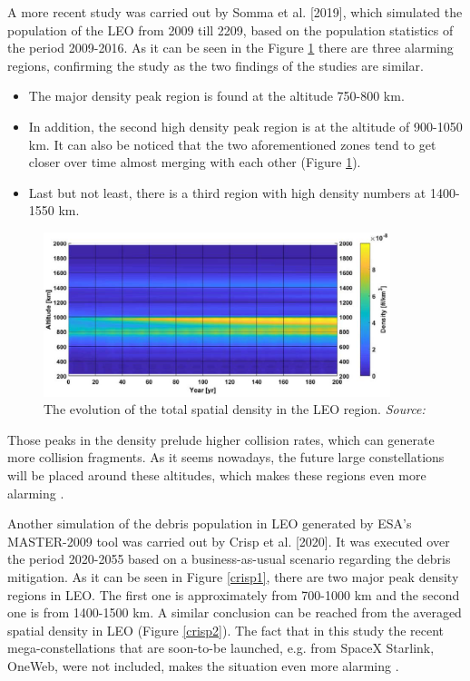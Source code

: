 A more recent study was carried out by Somma et al. [2019], which simulated the population of the LEO from 2009 till 2209, based on the population statistics of the period 2009-2016. As it can be seen in the Figure \ref{Somma} there are three alarming regions, confirming the \cite{Kramer 2002} study as the two findings of the studies are similar.
\begin{itemize}
\item The major density peak region is found at the altitude 750-800 km.
\item In addition, the second high density peak region is at the altitude of 900-1050 km. It can also be noticed that the two aforementioned zones tend to get closer over time almost merging with each other (Figure \ref{Somma}).
\item Last but not least, there is a third region with high density numbers at 1400-1550 km.
\end{itemize} 

\begin{figure}
\centering
\includegraphics[width=0.9\textwidth]{Images/Somma.png}\caption{The evolution of the total spatial density in the LEO region. \textit{Source: \cite{Somma 2019}}}
\label{Somma} 
\end{figure}

Those peaks in the density prelude higher collision rates, which can generate more collision fragments. As it seems nowadays, the future large constellations will be placed around these altitudes, which makes these regions even more alarming \cite{Somma 2019}.

Another simulation of the debris population in LEO generated by ESA's MASTER-2009 tool was carried out by Crisp et al. [2020]. It was executed over the period 2020-2055 based on a business-as-usual scenario regarding the debris mitigation. As it can be seen in Figure \ref{crisp1}, there are two major peak density regions in LEO. The first one is approximately from 700-1000 km and the second one is from 1400-1500 km. A similar conclusion can be reached from the averaged spatial density in LEO (Figure \ref{crisp2}). The fact that in this study the recent mega-constellations that are soon-to-be launched, e.g. from SpaceX Starlink, OneWeb, were not included, makes the situation even more alarming \cite{Crisp 2020}.

